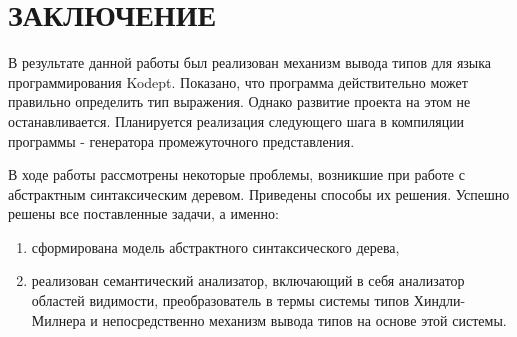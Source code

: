 \chapter*{ЗАКЛЮЧЕНИЕ}\label{chap_conclusion}

В результате данной работы был реализован механизм вывода типов для языка программирования Kodept.
Показано, что программа действительно может правильно определить тип выражения.
Однако развитие проекта на этом не останавливается.
Планируется реализация следующего шага в компиляции программы - генератора промежуточного представления.

В ходе работы рассмотрены некоторые проблемы, возникшие при работе с абстрактным синтаксическим деревом.
Приведены способы их решения.
Успешно решены все поставленные задачи, а именно:
\begin{enumerate}[1)]
    \item сформирована модель абстрактного синтаксического дерева,
    \item реализован семантический анализатор, включающий в себя анализатор областей видимости, преобразователь в термы системы типов Хиндли-Милнера и непосредственно механизм вывода типов на основе этой системы.
\end{enumerate}

